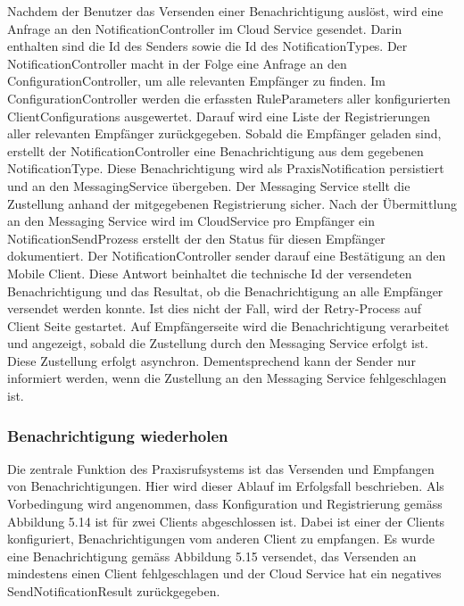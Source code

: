 Nachdem der Benutzer das Versenden einer Benachrichtigung auslöst, wird eine Anfrage an den NotificationController im Cloud Service gesendet.
Darin enthalten sind die Id des Senders sowie die Id des NotificationTypes.
Der NotificationController macht in der Folge eine Anfrage an den ConfigurationController, um alle relevanten Empfänger zu finden.
Im ConfigurationController werden die erfassten RuleParameters aller konfigurierten ClientConfigurations ausgewertet.
Darauf wird eine Liste der Registrierungen aller relevanten Empfänger zurückgegeben.
Sobald die Empfänger geladen sind, erstellt der NotificationController eine Benachrichtigung aus dem gegebenen NotificationType.
Diese Benachrichtigung wird als PraxisNotification persistiert und an den MessagingService übergeben.
Der Messaging Service stellt die Zustellung anhand der mitgegebenen Registrierung sicher.
Nach der Übermittlung an den Messaging Service wird im CloudService pro Empfänger ein NotificationSendProzess erstellt der den Status für diesen Empfänger dokumentiert.
Der NotificationController sender darauf eine Bestätigung an den Mobile Client.
Diese Antwort beinhaltet die technische Id der versendeten Benachrichtigung und das Resultat, ob die Benachrichtigung an alle Empfänger versendet werden konnte.
Ist dies nicht der Fall, wird der Retry-Process auf Client Seite gestartet.
Auf Empfängerseite wird die Benachrichtigung verarbeitet und angezeigt, sobald die Zustellung durch den Messaging Service erfolgt ist.
Diese Zustellung erfolgt asynchron.
Dementsprechend kann der Sender nur informiert werden, wenn die Zustellung an den Messaging Service fehlgeschlagen ist.

\clearpage
\subsubsection*{Benachrichtigung wiederholen}

Die zentrale Funktion des Praxisrufsystems ist das Versenden und Empfangen von Benachrichtigungen.
Hier wird dieser Ablauf im Erfolgsfall beschrieben.
Als Vorbedingung wird angenommen, dass Konfiguration und Registrierung gemäss Abbildung 5.14 ist für zwei Clients abgeschlossen ist.
Dabei ist einer der Clients konfiguriert, Benachrichtigungen vom anderen Client zu empfangen.
Es wurde eine Benachrichtigung gemäss Abbildung 5.15 versendet, das Versenden an mindestens einen Client fehlgeschlagen
und der Cloud Service hat ein negatives SendNotificationResult zurückgegeben.

